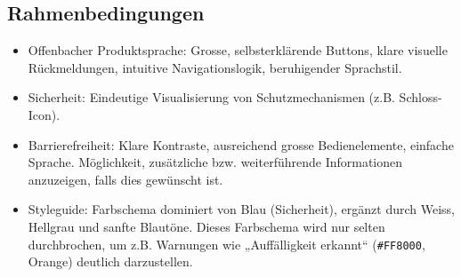 \vspace{1em}

\subsection{Rahmenbedingungen}
\begin{itemize}
	\item Offenbacher Produktsprache: Grosse, selbsterklärende Buttons, klare visuelle Rückmeldungen, intuitive Navigationslogik, beruhigender Sprachstil.
	\item Sicherheit: Eindeutige Visualisierung von Schutzmechanismen (z.B. Schloss-Icon).
	\item Barrierefreiheit: Klare Kontraste, ausreichend grosse Bedienelemente, einfache Sprache. Möglichkeit, zusätzliche bzw. weiterführende Informationen anzuzeigen, falls dies gewünscht ist.
	\item Styleguide: Farbschema dominiert von Blau (Sicherheit), ergänzt durch Weiss, Hellgrau und sanfte Blautöne. Dieses Farbschema wird nur selten durchbrochen, um z.B. Warnungen wie „Auffälligkeit erkannt“ (\texttt{\#FF8000}, Orange) deutlich darzustellen.
\end{itemize}

\newpage